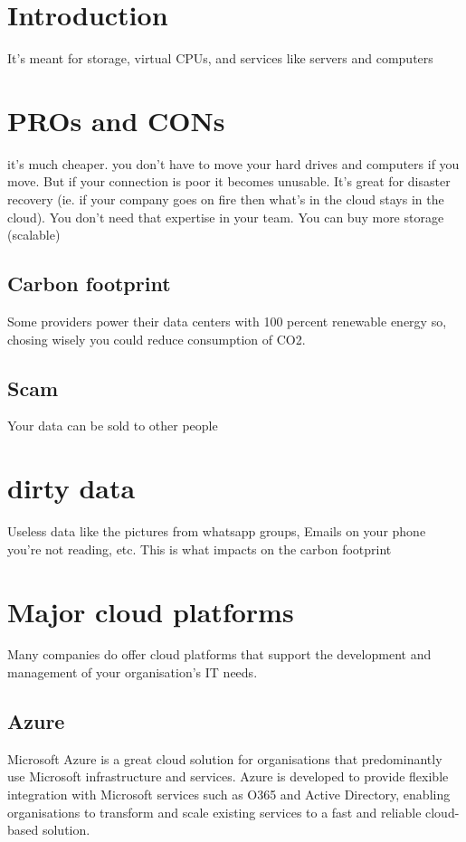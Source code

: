 \documentclass[a4paper,12pt]{book}
\begin{document}
\section{Introduction}
It's meant for storage, virtual CPUs, and services like servers and computers

\section{PROs and CONs}
it's much cheaper. you don't have to move your hard drives and computers if you move. But if your connection is poor it becomes unusable. It's great for disaster recovery (ie. if your company goes on fire then what's in the cloud stays in the cloud). You don't need that expertise in your team. You can buy more storage (scalable)

\subsection{Carbon footprint}
 Some providers power their data centers with 100 percent renewable energy so, chosing wisely you could reduce consumption of CO2. 

\subsection{Scam}
Your data can be sold to other people

\section{dirty data}
Useless data like the pictures from whatsapp groups, Emails on your phone you're not reading, etc. This is what impacts on the carbon footprint

\section{Major cloud platforms}
Many companies do offer cloud platforms that support the development and management of your organisation’s IT needs.
\subsection{Azure}
Microsoft Azure is a great cloud solution for organisations that predominantly use Microsoft infrastructure and services. Azure is developed to provide flexible integration with Microsoft services such as O365 and Active Directory, enabling organisations to transform and scale existing services to a fast and reliable cloud-based solution.
\end{document}
